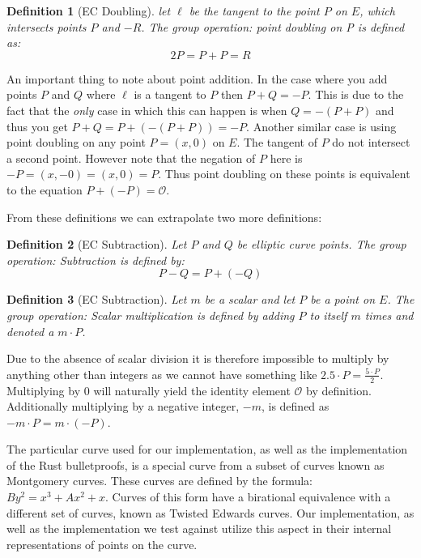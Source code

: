 \documentclass{article}
\newtheorem{definition}{Definition}[section]
\renewcommand{\O}{\mathcal{O}}
\begin{document}
\begin{definition}[EC Doubling]
	let $\ell$ be the tangent to the point $P$ on $E$, which intersects
	points $P$ and $-R$. The group operation: point doubling on P is
	defined as:
	$$2P = P + P = R$$
\end{definition}

An important thing to note about point addition. In the case where
you add points $P$ and $Q$ where $\ell$ is a tangent to $P$ then $P +
Q = -P$. This is due to the fact that the \textit{only} case in which
this can happen is when $Q = -(P + P)$ and thus you get $P + Q = P +
(-(P + P)) = -P$. Another similar case is using point doubling on any
point $P = (x,0)$ on $E$. The tangent of $P$ do not intersect
a second point. However note that the negation of $P$ here is $-P =
(x,-0) = (x,0) = P$. Thus point doubling on these points is equivalent
to the equation $P + (-P) = \O$.

From these definitions we can extrapolate two more definitions:

\begin{definition}[EC Subtraction]
	Let $P$ and $Q$ be elliptic curve points. The group operation:
	Subtraction is defined by:
	$$P-Q = P + (-Q)$$
\end{definition}

\begin{definition}[EC Subtraction]
	Let $m$ be a scalar and let $P$ be a point on $E$. The group operation:
	Scalar multiplication is defined by adding $P$ to itself $m$ times and
	denoted a $m\cdot P$.
\end{definition}

Due to the absence of scalar division it is therefore impossible to
multiply by anything other than integers as we cannot have something
like $2.5 \cdot P = \frac{5\cdot P}{2}$. Multiplying by $0$ will
naturally yield the identity element $\mathcal{O}$ by definition.
Additionally multiplying by a negative integer, ${-m}$, is defined as
$-m\cdot P = m\cdot ({-P})$. 

The particular curve used for our implementation, as well as the
implementation of the Rust bulletproofs, is a special curve from a subset
of curves known as Montgomery curves. These curves are defined by the
formula: $By^2 = x^3 + Ax^2 + x$. Curves of this form have a birational
equivalence with a different set of curves, known as Twisted Edwards
curves. Our implementation, as well as the implementation we test against
utilize this aspect in their internal representations of points on the
curve.
\end{document}
